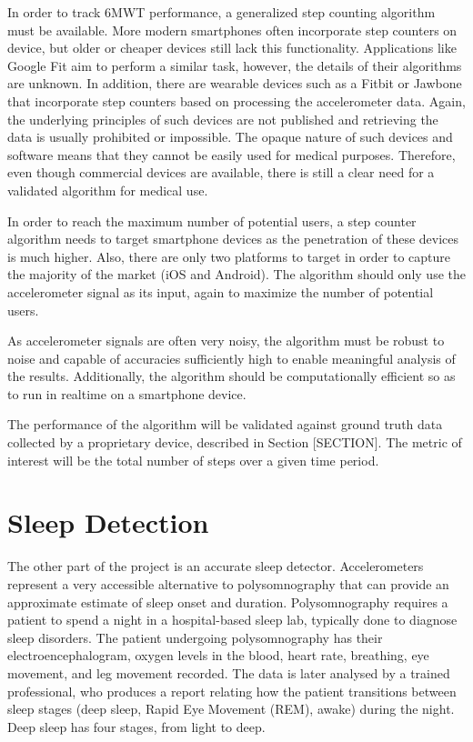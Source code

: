             In order to track 6MWT performance, a generalized step counting algorithm must be available. More modern smartphones often incorporate step counters on device, but older or cheaper devices still lack this functionality. Applications like Google Fit aim to perform a similar task, however, the details of their algorithms are unknown. In addition, there are wearable devices such as a Fitbit or Jawbone that incorporate step counters based on processing the accelerometer data. Again, the underlying principles of such devices are not published and retrieving the data is usually prohibited or impossible. The opaque nature of such devices and software means that they cannot be easily used for medical purposes. Therefore, even though commercial devices are available, there is still a clear need for a validated algorithm for medical use.

            In order to reach the maximum number of potential users, a step counter algorithm needs to target smartphone devices as the penetration of these devices is much higher. Also, there are only two platforms to target in order to capture the majority of the market (iOS and Android). The algorithm should only use the accelerometer signal as its input, again to maximize the number of potential users.

            As accelerometer signals are often very noisy, the algorithm must be robust to noise and capable of accuracies sufficiently high to enable meaningful analysis of the results. Additionally, the algorithm should be computationally efficient so as to run in realtime on a smartphone device.

            The performance of the algorithm will be validated against ground truth data collected by a proprietary device, described in Section [SECTION]. The metric of interest will be the total number of steps over a given time period.

        \section{Sleep Detection}

            The other part of the project is an accurate sleep detector. Accelerometers represent a very accessible alternative to polysomnography that can provide an approximate estimate of sleep onset and duration. Polysomnography requires a patient to spend a night in a hospital-based sleep lab, typically done to diagnose sleep disorders. The patient undergoing polysomnography has their electroencephalogram, oxygen levels in the blood, heart rate, breathing, eye movement, and leg movement recorded. The data is later analysed by a trained professional, who produces a report relating how the patient transitions between sleep stages (deep sleep, Rapid Eye Movement (REM), awake) during the night. Deep sleep has four stages, from light to deep.

